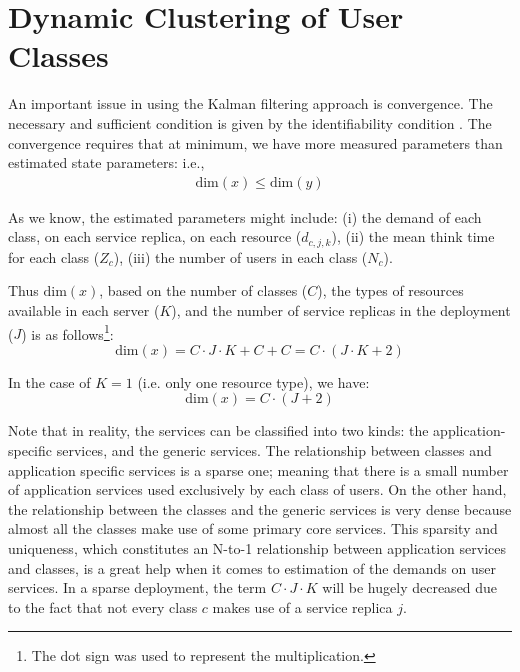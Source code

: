 	 
\section{Dynamic Clustering of User Classes}  
  An important issue in using the Kalman filtering approach is convergence. The necessary and sufficient condition is given by the identifiability condition \cite{tanizaki_nonlinear_1996,wan_unscented_2000,welch_introduction_1995}. The convergence requires that at minimum, we have more measured parameters than estimated state parameters: i.e., 
   \begin{align}  
   \text{dim}(x) \leq \text{dim}(y)    \label{eq:identifiability}
    \end{align}    

 As we know, the estimated parameters might include:   
  (i) the demand of each class, on each service replica, on each resource ($d_{c,j,k}$), 
  (ii) the mean think time for each class ($Z_c$), 
 (iii) the number of users in each class ($N_c$).  
 
	  
 Thus $\text{dim}(x)$, based on the number of classes ($C$), the types of resources available in each server ($K$), and the number of service replicas in the deployment ($J$) is as follows\footnote{The dot sign was used to represent the multiplication.}:                
 \[ \text{dim}(x)=C\cdot J\cdot K +  C + C = C\cdot (J\cdot K+2) \]
 
In the case of $K=1$ (i.e. only one resource type), we have: \[\text{dim}(x)=C\cdot (J+2)\] 

 Note that in reality, the services can be classified into two kinds: the application-specific services, and the generic services.
   The relationship between classes and application specific services is a sparse one; meaning that there is a small number of application services used exclusively by each class of users. On the other hand, the relationship between the classes and the generic services is very dense because almost all the classes make use of some primary core services. 
   This sparsity and uniqueness, which constitutes an N-to-1 relationship between application services and classes, is a great help when it comes to estimation of the demands on user services. 
 In a sparse deployment, the term $C\cdot J\cdot K$ will be hugely decreased due to the fact that  not every class $c$ makes use of a service replica $j$. 
 
